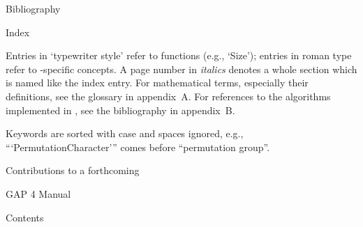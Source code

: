 

\FrontMatter
%
%

\Chapters
%


\Appendices


\Chapter Bibliography

\Bibliography

\Chapter Index

Entries in     `typewriter style' refer  to   {\GAP}  functions (e.g.,
`Size'); entries in roman type   refer to {\GAP}-specific concepts.  A
page number in  {\it italics} denotes a  whole section which is  named
like the   index  entry.  For  mathematical terms,    especially their
definitions, see   the glossary in  appendix~A. For  references to the
algorithms implemented in {\GAP}, see the bibliography in appendix~B.

Keywords   are   sorted  with    case  and   spaces    ignored,  e.g.,
```PermutationCharacter''' comes before ``permutation group''.

\Index

\null\vfill
\centerline{\titlefont Contributions to a forthcoming}
\centerline{\titlefont GAP 4 Manual}

\Chapter Contents
  
\TableOfContents

\bye
